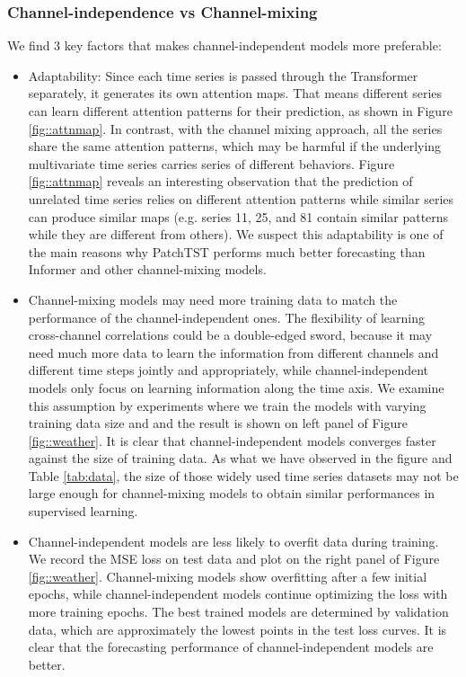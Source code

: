 \documentclass{article} %
\begin{document}
\subsubsection{Channel-independence vs Channel-mixing}
\label{sec::civsmix}

We find 3 key factors that makes channel-independent models more preferable:

\begin{itemize}[leftmargin= 20 pt,itemsep= 5 pt,topsep = 5 pt]
    \item Adaptability: Since each time series is passed through the Transformer separately, it generates its own attention maps. That means different series can learn different attention patterns for their prediction, as shown in Figure \ref{fig::attnmap}. In contrast, with the channel mixing approach, all the series share the same attention patterns, which may be harmful if the underlying multivariate time series carries series of different behaviors. Figure \ref{fig::attnmap} reveals an interesting observation that the prediction of unrelated time series relies on different attention patterns while similar series can produce similar maps (e.g. series 11, 25, and 81 contain similar patterns while they are different from others). We suspect this adaptability is one of the main reasons why PatchTST performs much better forecasting than Informer and other channel-mixing models.

    \item Channel-mixing models may need more training data to match the performance of the channel-independent ones. The flexibility of learning cross-channel correlations could be a double-edged sword, because it may need much more data to learn the information from different channels and different time steps jointly and appropriately, while channel-independent models only focus on learning information along the time axis. We examine this assumption by experiments where we train the models with varying training data size and  and the result is shown on left panel of Figure \ref{fig::weather}.  It is clear that channel-independent models converges faster against the size of training data. As what we have observed in the figure and Table \ref{tab:data}, the size of those widely used time series datasets may not be large enough for channel-mixing models to obtain similar performances in supervised learning.
    
    \item Channel-independent models are less likely to overfit data during training. We record the MSE loss on test data and plot on the right panel of Figure \ref{fig::weather}. Channel-mixing models show overfitting after a few initial epochs, while channel-independent models continue optimizing the loss with more training epochs. The best trained models are determined by validation data, which are approximately the lowest points in the test loss curves. It is clear that the forecasting performance of channel-independent models are better. 
\end{itemize}
\end{document}
